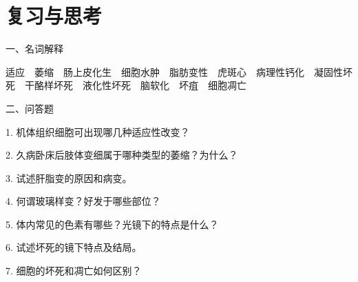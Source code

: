 \section*{复习与思考}

{一、名词解释}

适应　萎缩　肠上皮化生　细胞水肿　脂肪变性　虎斑心　病理性钙化　凝固性坏死　干酪样坏死　液化性坏死　脑软化　坏疽　细胞凋亡

{二、问答题}

1. 机体组织细胞可出现哪几种适应性改变？

2. 久病卧床后肢体变细属于哪种类型的萎缩？为什么？

3. 试述肝脂变的原因和病变。

4. 何谓玻璃样变？好发于哪些部位？

5. 体内常见的色素有哪些？光镜下的特点是什么？

6. 试述坏死的镜下特点及结局。

7. 细胞的坏死和凋亡如何区别？

